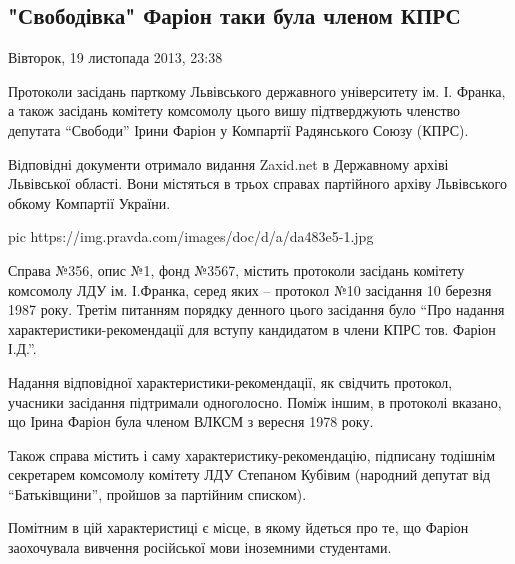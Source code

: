  
 
 
 
 
 
\subsection{"Свободівка" Фаріон таки була членом КПРС}
\label{sec:19_11_2013.news.ua.pravda.1.farion_kpss}

Вівторок, 19 листопада 2013, 23:38

Протоколи засідань парткому Львівського державного університету ім. І. Франка,
а також засідань комітету комсомолу цього вишу підтверджують членство депутата
\enquote{Свободи} Ірини Фаріон у Компартії Радянського Союзу (КПРС).

Відповідні документи отримало видання Zaxid.net в Державному архіві Львівської
області. Вони містяться в трьох справах партійного архіву Львівського обкому
Компартії України.

\ifcmt
pic https://img.pravda.com/images/doc/d/a/da483e5-1.jpg
\fi

Справа №356, опис №1, фонд №3567, містить протоколи засідань комітету комсомолу
ЛДУ ім. І.Франка, серед яких – протокол №10 засідання 10 березня 1987 року.
Третім питанням порядку денного цього засідання було \enquote{Про надання
характеристики-рекомендації для вступу кандидатом в члени КПРС тов. Фаріон
І.Д.}.

Надання відповідної характеристики-рекомендації, як свідчить протокол, учасники
засідання підтримали одноголосно. Поміж іншим, в протоколі вказано, що Ірина
Фаріон була членом ВЛКСМ з вересня 1978 року.

Також справа містить і саму характеристику-рекомендацію, підписану тодішнім
секретарем комсомолу комітету ЛДУ Степаном Кубівим (народний депутат від
\enquote{Батьківщини}, пройшов за партійним списком).

Помітним в цій характеристиці є місце, в якому йдеться про те, що Фаріон
заохочувала вивчення російської мови іноземними студентами.

